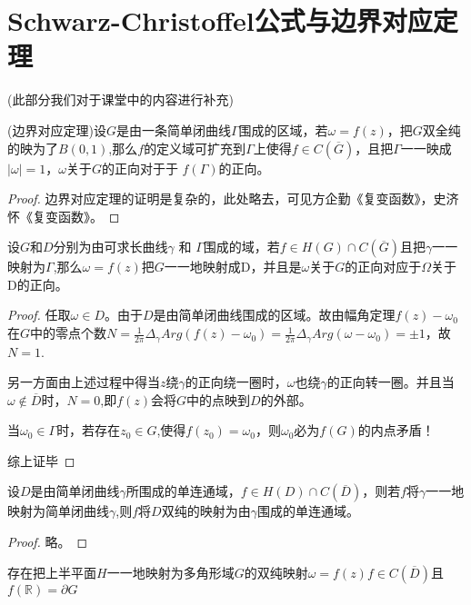 \section{Schwarz-Christoffel公式与边界对应定理}
(此部分我们对于课堂中的内容进行补充)
    \begin{theorem}\label{1E}
        (边界对应定理)设$G$是由一条简单闭曲线$\Gamma$围成的区域，若$\omega = f\left(z \right) $，把$G$双全纯的映为了$ B(0,1)$,那么$f$的定义域可扩充到$\Gamma$上使得$ f \in C \left( \overline G \right)$，且把$\Gamma$一一映成 $ \left | \omega \right | = 1$，$ \omega$关于$G$的正向对于于 $f \left (  \Gamma  \right )$的正向。
    \end{theorem}
    \begin{proof}
    边界对应定理的证明是复杂的，此处略去，可见方企勤《复变函数》，史济怀《复变函数》。
 	\end{proof}
    \begin{theorem}\label{2E}
     设$G$和$D$分别为由可求长曲线$\gamma$ 和 $ \Gamma $围成的域，若$ f \in H\left ( G \right ) \cap C\left ( \overline G \right )$且把$\gamma$一一映射为$ \Gamma$,那么$ \omega = f\left(z \right)$把$G$一一地映射成D，并且是$\omega$关于$G$的正向对应于$\Omega $关于D的正向。 
    \end{theorem}
    \begin{proof}
    任取$ \omega \in D$。由于$D$是由简单闭曲线围成的区域。故由幅角定理$f\left(z \right) - \omega_0$在$G$中的零点个数$N=\frac{1}{2\pi}\Delta_\gamma Arg\left(  f\left(z \right)-\omega_0 \right)=\frac{1}{2\pi}\Delta_\gamma Arg\left(  \omega-\omega_0 \right) =\pm 1$，故$N=1$.\par
   另一方面由上述过程中得当$z$绕$\gamma$的正向绕一圈时，$\omega$也绕$\gamma$的正向转一圈。并且当$\omega \notin \overline D$时，$N=0$,即$ f\left(z \right)$会将$G$中的点映到$D$的外部。\par
   当$\omega_0 \in \Gamma$时，若存在$z_0 \in G$,使得$ f\left(z_0 \right)=\omega_0$，则$\omega_0$必为$f\left(G \right)$的内点矛盾！\par
   综上证毕
 	\end{proof}
    \begin{theorem}\label{3E}
    设$D$是由简单闭曲线$\gamma$所围成的单连通域，$f \in H \left ( D\right) \cap C \left (\overline D\right)$，则若$f$将$\gamma$一一地映射为简单闭曲线$\gamma$,则$f$将$D$双纯的映射为由$\gamma$围成的单连通域。
    \end{theorem}
    \begin{proof}
    略。
 	\end{proof}
    \begin{theorem}\label{4E}
     存在把上半平面$H$一一地映射为多角形域$G$的双纯映射$\omega = f\left ( z\right ) f \in C\left ( \overline D\right )$且$ f\left ( \mathbb{R}\right )=\partial G$
    \end{theorem}
